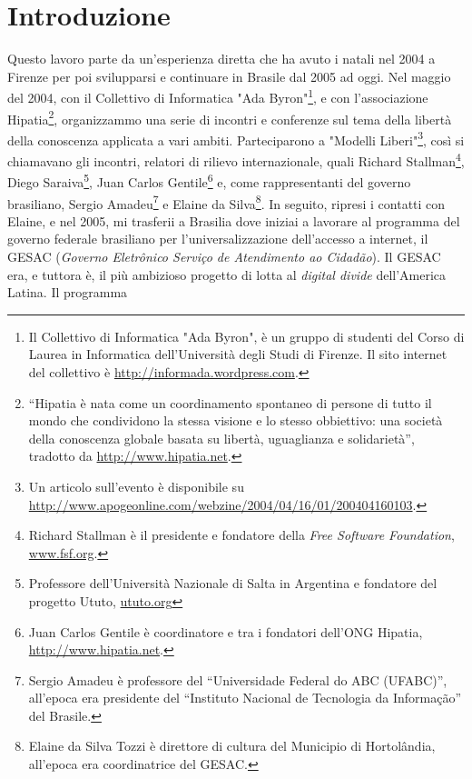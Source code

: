
\chapter{Introduzione}
\label{Capitolo1}

Questo lavoro parte da un'esperienza diretta che ha avuto i natali nel
2004 a Firenze per poi svilupparsi e continuare in Brasile dal 2005 ad
oggi. Nel maggio del 2004, con il Collettivo di Informatica "Ada
Byron"\footnote{Il Collettivo di Informatica "Ada Byron", è un gruppo
  di studenti del Corso di Laurea in Informatica dell’Università degli
  Studi di Firenze. Il sito internet del collettivo è
  \url{http://informada.wordpress.com}.}, e con l'associazione
Hipatia\footnote{``Hipatia è nata come un coordinamento spontaneo di
  persone di tutto il mondo che condividono la stessa visione e lo
  stesso obbiettivo: una società della conoscenza globale basata su
  libertà, uguaglianza e solidarietà'', tradotto da
  \url{http://www.hipatia.net}.  }, organizzammo una serie di incontri
e conferenze sul tema della libertà della conoscenza applicata a vari
ambiti. Parteciparono a "Modelli Liberi"\footnote{Un articolo
  sull'evento è disponibile su
  \url{http://www.apogeonline.com/webzine/2004/04/16/01/200404160103}.},
così si chiamavano gli incontri, relatori di rilievo internazionale,
quali Richard Stallman\footnote{Richard Stallman è il presidente e
  fondatore della \emph{Free Software Foundation},
  \url{www.fsf.org}.}, Diego Saraiva\footnote{Professore
  dell'Università Nazionale di Salta in Argentina e fondatore del
  progetto Ututo, \url{ututo.org}}, Juan Carlos Gentile\footnote{Juan
  Carlos Gentile è coordinatore e tra i fondatori dell'ONG Hipatia,
  \url{http://www.hipatia.net}.} e, come rappresentanti del governo
brasiliano, Sergio Amadeu\footnote{Sergio Amadeu è professore del
  ``Universidade Federal do ABC (UFABC)'', all'epoca era presidente
  del ``Instituto Nacional de Tecnologia da Informação'' del Brasile.}
e Elaine da Silva\footnote{Elaine da Silva Tozzi è direttore di
  cultura del Municipio di Hortolândia, all'epoca era coordinatrice
  del GESAC.}. In seguito, ripresi i contatti con Elaine, e nel 2005,
mi trasferii a Brasilia dove iniziai a lavorare al programma del
governo federale brasiliano per l'universalizzazione dell'accesso a
internet, il GESAC (\emph{Governo Eletrônico Serviço de Atendimento ao
  Cidadão}). Il GESAC era, e tuttora è, il più ambizioso progetto di
lotta al \emph{digital divide} dell'America Latina. Il programma
